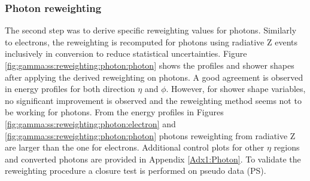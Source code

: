 \subsubsection{Photon reweighting}
The second step was to derive specific reweighting values for photons. Similarly to electrons, the reweighting is recomputed for photons using radiative Z events inclusively in conversion to reduce statistical uncertainties. Figure \ref{fig:gamma:ss:reweighting:photon:photon} shows the profiles and shower shapes after applying the derived reweighting on photons. A good agreement is observed in energy profiles for both direction $\eta$ and $\phi$. However, for shower shape variables, no significant improvement is observed and the reweighting method seems not to be working for photons. From the energy profiles in Figures \ref{fig:gamma:ss:reweighting:photon:electron} and \ref{fig:gamma:ss:reweighting:photon:photon} photons reweighting from radiative Z are larger than the one for electrons. Additional control plots for other $\eta$ regions and converted photons are provided in Appendix \ref{Adx1:Photon}. To validate the reweighting procedure a closure test is performed on pseudo data (PS).
